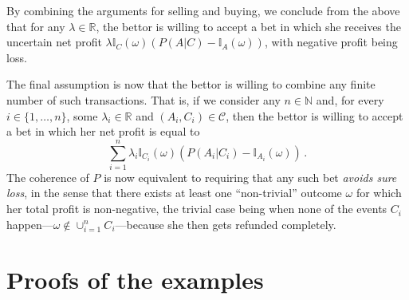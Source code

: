 \documentclass[10pt,a4paper]{paper}
\theoremstyle{definition}
\newcommand{\nats}{\mathbb{N}}
\newcommand{\reals}{\mathbb{R}}
\newcommand{\ind}[1]{\mathbb{I}_{#1}}
\begin{document}
By combining the arguments for selling and buying, we conclude from the above that for any $\lambda\in\reals$, the bettor is willing to accept a bet in which she receives the uncertain net profit $\lambda\ind{C}(\omega)(P(A\vert C)-\ind{A}(\omega))$, with negative profit being loss.


The final assumption is now that the bettor is willing to combine any finite number of such transactions. That is, if we consider any $n\in\nats$ and, for every $i\in\{1,\ldots,n\}$, some $\lambda_i\in\reals$ and $(A_i,C_i)\in\mathcal{C}$, then the bettor is willing to accept a bet in which her net profit is equal to
\begin{equation*}
\sum_{i=1}^n\lambda_i\ind{C_i}(\omega)\left(P(A_i\vert C_i) - \ind{A_i}(\omega)\right)\,.
\end{equation*}
The coherence of $P$ is now equivalent to requiring that any such bet \emph{avoids sure loss}, in the sense that there exists at least one ``non-trivial'' outcome $\omega$ for which her total profit is non-negative, the trivial case being when none of the events $C_i$ happen---$\omega\notin\cup_{i=1}^n C_i$---because she then gets refunded completely. 

\section{Proofs of the examples}\label{app:example_proofs}
\end{document}
